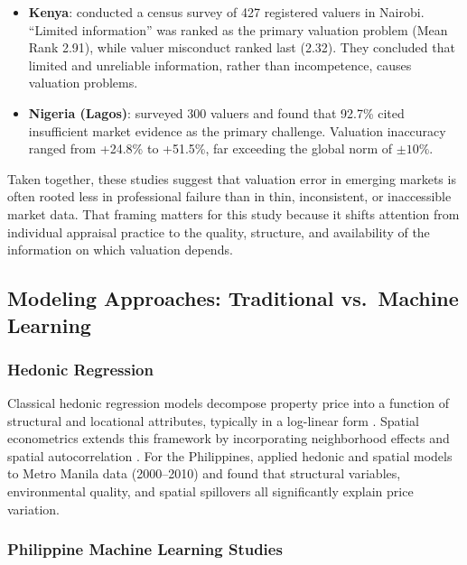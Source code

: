 \begin{itemize}
\item \textbf{Kenya}: \textcite{cheloti2021} conducted a census survey of 427 registered valuers in Nairobi. ``Limited information'' was ranked as the primary valuation problem (Mean Rank 2.91), while valuer misconduct ranked last (2.32). They concluded that limited and unreliable information, rather than incompetence, causes valuation problems.
\item \textbf{Nigeria (Lagos)}: \textcite{ajibola2010} surveyed 300 valuers and found that 92.7\% cited insufficient market evidence as the primary challenge. Valuation inaccuracy ranged from +24.8\% to +51.5\%, far exceeding the global norm of $\pm 10\%$.
\end{itemize}

Taken together, these studies suggest that valuation error in emerging markets is often rooted less in professional failure than in thin, inconsistent, or inaccessible market data. That framing matters for this study because it shifts attention from individual appraisal practice to the quality, structure, and availability of the information on which valuation depends.


\subsection{Modeling Approaches: Traditional vs.~Machine Learning}\label{modeling-approaches-traditional-vs.-machine-learning}

\subsubsection{Hedonic Regression}\label{hedonic-regression}

Classical hedonic regression models decompose property price into a function of structural and locational attributes, typically in a log-linear form \parencite{rosen1974,malpezzi2003}. Spatial econometrics extends this framework by incorporating neighborhood effects and spatial autocorrelation \parencite{anselin1988}. For the Philippines, \textcite{dann2020} applied hedonic and spatial models to Metro Manila data (2000--2010) and found that structural variables, environmental quality, and spatial spillovers all significantly explain price variation.

\subsubsection{Philippine Machine Learning Studies}\label{philippine-machine-learning-studies}

